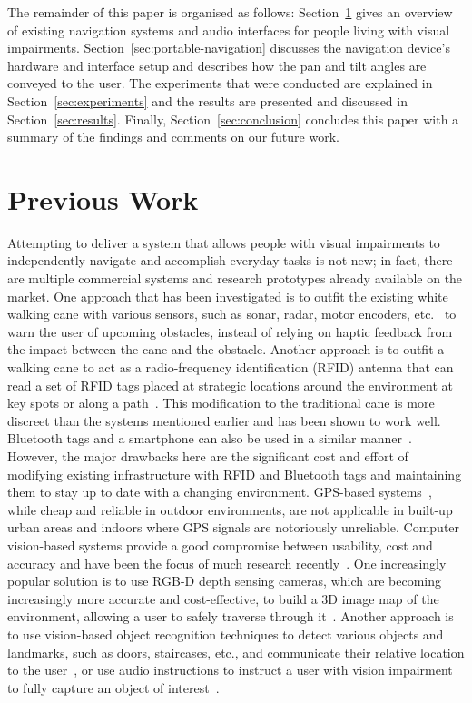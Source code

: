 \documentclass[sigconf, review=true, screen=true, anonymous=true]{acmart}
\begin{document}
The remainder of this paper is organised as follows: Section~\ref{sec:lit-review} gives an overview of existing navigation systems and audio interfaces for people living with visual impairments. Section~\ref{sec:portable-navigation} discusses the navigation device's hardware and interface setup and describes how the pan and tilt angles are conveyed to the user. The experiments that were conducted are explained in Section~\ref{sec:experiments} and the results are presented and discussed in Section~\ref{sec:results}. Finally, Section~\ref{sec:conclusion} concludes this paper with a summary of the findings and comments on our future work. 

\section{Previous Work}
\label{sec:lit-review}

Attempting to deliver a system that allows people with visual impairments to independently navigate and accomplish everyday tasks is not new; in fact, there are multiple commercial systems and research prototypes already available on the market. One approach that has been investigated is to outfit the existing white walking cane with various sensors, such as sonar, radar, motor encoders, etc.~\cite{ulrich1997, marion2008batcane} to warn the user of upcoming obstacles, instead of relying on haptic feedback from the impact between the cane and the obstacle. Another approach is to outfit a walking cane to act as a radio-frequency identification (RFID) antenna that can read a set of RFID tags placed at strategic locations around the environment at key spots or along a path~\cite{faria2010electronic, willis2005}. This modification to the traditional cane is more discreet than the systems mentioned earlier and has been shown to work well. Bluetooth tags and a smartphone can also be used in a similar manner~\cite{sato2017navcog3}. However, the major drawbacks here are the significant cost and effort of modifying existing infrastructure with RFID and Bluetooth tags and maintaining them to stay up to date with a changing environment. GPS-based systems~\cite{ran2004drishti, loomis2001navigating, kammoun2012navigation}, while cheap and reliable in outdoor environments, are not applicable in built-up urban areas and indoors where GPS signals are notoriously unreliable. Computer vision-based systems provide a good compromise between usability, cost and accuracy and have been the focus of much research recently~\cite{manduchi2014last}. One increasingly popular solution is to use RGB-D depth sensing cameras, which are becoming increasingly more accurate and cost-effective, to build a 3D image map of the environment, allowing a user to safely traverse through it~\cite{lee2015, rodriguez2012obstacle}. Another approach is to use vision-based object recognition techniques to detect various objects and landmarks, such as doors, staircases, etc., and communicate their relative location to the user~\cite{schauerte2012assistive, tian2013b, fiannaca2014headlock}, or use audio instructions to instruct a user with vision impairment to fully capture an object of interest~\cite{vazquez2012helping}. 
\end{document}
